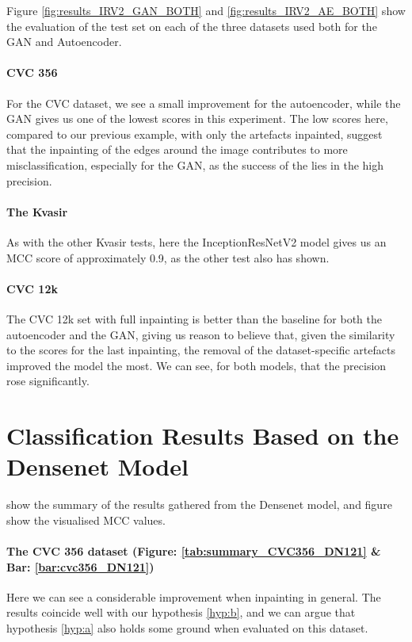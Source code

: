 \noindent Figure \ref{fig:results_IRV2_GAN_BOTH} and \ref{fig:results_IRV2_AE_BOTH} show the evaluation of the test set on each of the three datasets used both for the GAN and Autoencoder.


\paragraph{CVC 356}
For the CVC dataset, we see a small improvement for the autoencoder, while the GAN gives us one of the lowest scores in this experiment.
The low scores here, compared to our previous example, with only the artefacts inpainted, suggest that the inpainting of the edges around the image contributes to more misclassification, especially for the GAN, as the success of the lies in the high precision. 

\paragraph{The Kvasir}
As with the other Kvasir tests, here the InceptionResNetV2 model gives us an MCC score of approximately 0.9, as the other test also has shown.

\paragraph{CVC 12k}
The CVC 12k set with full inpainting is better than the baseline for both the autoencoder and the GAN, giving us reason to believe that, given the similarity to the scores for the last inpainting, the removal of the dataset-specific artefacts improved the model the most.
We can see, for both models, that the precision rose significantly.








\FloatBarrier
\section{Classification Results Based on the Densenet Model}
 show the summary of the results gathered from the Densenet model, and figure  show the visualised MCC values. 

\paragraph{The CVC 356 dataset (Figure: \ref{tab:summary_CVC356_DN121} \& Bar: \ref{bar:cvc356_DN121})}
Here we can see a considerable improvement when inpainting in general. The results coincide well with our hypothesis \ref{hyp:b}, and we can argue that hypothesis \ref{hyp:a} also holds some ground when evaluated on this dataset. 

